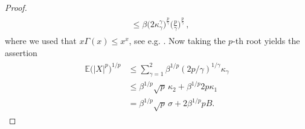 \documentclass[11pt,reqno]{article}
\numberwithin{equation}{section}
\theoremstyle{definition}
\theoremstyle{plain}
\newcommand{\E}{\ensuremath{\mathbb{E}}}
\begin{document}
\begin{proof}
\begin{align}
\begin{split}
& \leq \beta \big(2\kappa_\gamma^\gamma\big)^{\frac{p}{\gamma}} \Big(\frac{p}{\gamma}\Big)^{\frac{p}{\gamma}}\,, 
\end{split}
\end{align}
where we used that \( x\Gamma(x) \leq x^x\), see e.g. \cite[Lem.\ 4.9]{KSU14}.
Now taking the \(p\)-th root yields the assertion
\begin{align}
\begin{split}
    \E\big(\vert X \vert^p\big)^{1/p} & \leq \sum_{\gamma=1}^2 \beta^{1/p}  (2p/\gamma)^{1/{\gamma}} \kappa_\gamma \\
    & \leq \beta^{1/p}\sqrt{p}\, \kappa_2 + \beta^{1/p} 2p \kappa_1 \\
    & = \beta^{1/p}\sqrt{p}\, \sigma + 2\beta^{1/p} p B.
\end{split}
\end{align}

\end{proof}  
\end{document}

